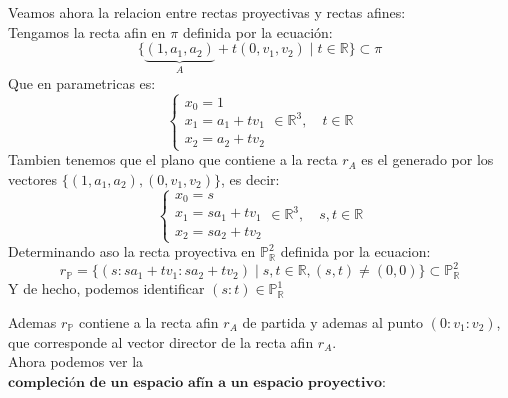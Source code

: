 Veamos ahora la relacion entre rectas proyectivas y rectas afines:\\

Tengamos la recta afin en $\pi$ definida por la ecuación:
\[
    \{\underbrace{(1,a_1,a_2)}_{A} + t(0,v_1,v_2) \mid t \in \mathbb{R} \} \subset \pi
\]
Que en parametricas es:
\[
    \begin{cases}
        x_0 = 1 \\
        x_1 = a_1 + t v_1 \\
        x_2 = a_2 + t v_2
    \end{cases} \in \mathbb{R}^3, \quad t \in \mathbb{R}
\]
Tambien tenemos que el plano que contiene a la recta $r_A$ es el generado por los vectores $\{(1,a_1,a_2), (0,v_1,v_2)\}$, es decir:
\[
    \begin{cases}
        x_0 = s \\
        x_1 = s a_1 + t v_1 \\
        x_2 = s a_2 + t v_2
    \end{cases} \in \mathbb{R}^3, \quad s,t \in \mathbb{R}
\]
Determinando aso la recta proyectiva en $\mathbb{P}^2_{\mathbb{R}}$ definida por la ecuacion:
\[
    r_{\mathbb{P}} = \{ (s : s a_1 + t v_1 : s a_2 + t v_2) \mid s,t \in \mathbb{R}, (s,t) \neq (0,0) \} \subset \mathbb{P}^2_{\mathbb{R}}
\]
Y de hecho, podemos identificar $(s:t) \in \mathbb{P}^1_{\mathbb{R}}$

Ademas $r_{\mathbb{P}}$ contiene a la recta afin $r_A$ de partida y ademas al punto $(0:v_1:v_2)$, que corresponde al vector director de la recta afin $r_A$.\\

Ahora podemos ver la $\textbf{compleción de un espacio afín a un espacio proyectivo}$:

